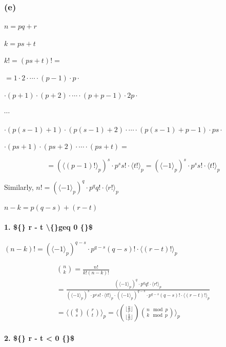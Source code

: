 \documentclass{article}
\begin{document}
\subsubsection*{(e)}

\( n = pq + r \)

\( k = ps + t \)

\( k! = (ps+t)! = \)

\( = 1 \cdot 2 \cdot \cdots \cdot (p-1) \cdot p \cdot \)

\( \cdot (p+1) \cdot (p+2) \cdot \cdots \cdot (p + p-1) \cdot 2p \cdot \)

\( \cdots \)

\( \cdot (p(s-1)+1) \cdot (p(s-1)+2) \cdot \cdots \cdot (p(s-1) + p-1) \cdot ps \cdot \)

\( \cdot (ps+1) \cdot (ps+2) \cdot \cdots \cdot (ps + t) = \)

\[ = {(\langle(p-1)!\rangle_{p})}^{s} \cdot p^{s} s! \cdot \langle t!\rangle_{p} = {(\langle-1\rangle_{p})}^{s} \cdot p^{s} s! \cdot \langle t!\rangle_{p} \]

Similarly, \( n! = {(\langle-1\rangle_{p})}^{q} \cdot p^{q} q! \cdot \langle r!\rangle_{p} \)

\( n - k = p(q-s) + (r - t) \)

\paragraph*{1. \$\{\} r \mbox{-} t \textbackslash\{\}geq 0 \{\}\$}

\( (n-k)! = {(\langle-1\rangle_{p})}^{q-s} \cdot p^{q-s} (q-s)! \cdot \langle (r-t)!\rangle_{p} \)

\begin{multline*}
\binom{n}{k} = \frac{n!}{k!(n-k)!} \\
= \frac{{(\langle-1\rangle_{p})}^{q} \cdot p^{q} q! \cdot \langle r!\rangle_{p}}{{(\langle-1\rangle_{p})}^{s} \cdot p^{s} s! \cdot \langle t!\rangle_{p} \cdot {(\langle-1\rangle_{p})}^{q-s} \cdot p^{q-s} (q-s)! \cdot \langle (r-t)!\rangle_{p}} \\
= \langle\binom{q}{s}\binom{r}{t}\rangle_{p} = \langle\binom{\lfloor\frac{n}{p}\rfloor}{\lfloor\frac{k}{p}\rfloor}\binom{n \mod p}{k \mod p}\rangle_{p}
\end{multline*}

\paragraph*{2. \$\{\} r \mbox{-} t < 0 \{\}\$}
\end{document}
